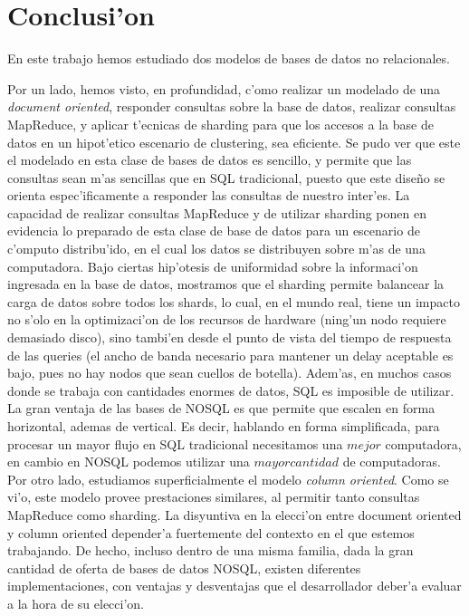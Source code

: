 \section{Conclusi'on}

En este trabajo hemos estudiado dos modelos de bases de datos no relacionales.

Por un lado, hemos visto, en profundidad, c'omo realizar un modelado de una \textit{document oriented}, responder consultas sobre la base de datos, realizar consultas MapReduce, y aplicar t'ecnicas de sharding para que los accesos a la base de datos en un hipot'etico escenario de clustering, sea eficiente. Se pudo ver que este el modelado en esta clase de bases de datos es sencillo, y permite que las consultas sean m'as sencillas que en SQL tradicional, puesto que este dise\~no se orienta espec'ificamente a responder las consultas de nuestro inter'es. La capacidad de realizar consultas MapReduce y de utilizar sharding ponen en evidencia lo preparado de esta clase de base de datos para un escenario de c'omputo distribu'ido, en el cual los datos se distribuyen sobre m'as de una computadora. Bajo ciertas hip'otesis de uniformidad sobre la informaci'on ingresada en la base de datos, mostramos que el sharding permite balancear la carga de datos sobre todos los shards, lo cual, en el mundo real, tiene un impacto no s'olo en la optimizaci'on de los recursos de hardware (ning'un nodo requiere demasiado disco), sino tambi'en desde el punto de vista del tiempo de respuesta de las queries (el ancho de banda necesario para mantener un delay aceptable es bajo, pues no hay nodos que sean cuellos de botella).
Adem'as, en muchos casos donde se trabaja con cantidades enormes de datos, SQL es imposible de utilizar. La gran ventaja de las bases de NOSQL es que permite que escalen en forma horizontal, ademas de vertical. Es decir, hablando en forma simplificada, para procesar un mayor flujo en SQL tradicional necesitamos una $mejor$ computadora, en cambio en NOSQL podemos utilizar una $mayor cantidad$ de computadoras.
Por otro lado, estudiamos superficialmente el modelo \textit{column oriented}. Como se vi'o, este modelo provee prestaciones similares, al permitir tanto consultas MapReduce como sharding. La disyuntiva en la elecci'on entre document oriented y column oriented depender'a fuertemente del contexto en el que estemos trabajando. De hecho, incluso dentro de una misma familia, dada la gran cantidad de oferta de bases de datos NOSQL, existen diferentes implementaciones, con ventajas y desventajas que el desarrollador deber'a evaluar a la hora de su elecci'on.

